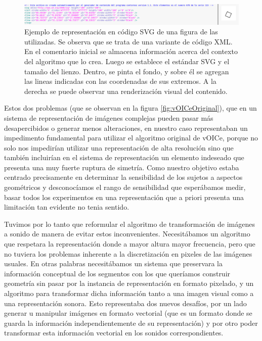\documentclass{article}
\begin{document}
    \begin{figure}
        \center
        \includegraphics[width=\textwidth]{Imagenes/678SVG.png}
        \caption{Ejemplo de representación en código SVG de una figura de las utilizadas. Se observa que se trata de una variante de código XML. En el comentario inicial se almacena información acerca del contexto del algoritmo que lo crea. Luego se establece el estándar SVG y el tamaño del lienzo. Dentro, se pinta el fondo, y sobre él se agregan las lineas indicadas con las coordenadas de sus extremos. A la derecha se puede observar una renderización visual del contenido.}
        \label{fig:SVGtoPNG}
    \end{figure}
    
    Estos dos problemas (que se observan en la figura \ref{fig:vOICeOriginal}), que en un sistema de representación de imágenes complejas pueden pasar más desapercibidos o generar menos alteraciones, en nuestro caso representaban un impedimento fundamental para utilizar el algoritmo original de vOICe, porque no solo nos impedirían utilizar una representación de alta resolución sino que también incluirían en el sistema de representación un elemento indeseado que presenta una muy fuerte ruptura de simetría. Como nuestro objetivo estaba centrado precisamente en determinar la sensibilidad de los sujetos a aspectos geométricos y desconocíamos el rango de sensibilidad que esperábamos medir, basar todos los experimentos en una representación que a priori presenta una limitación tan evidente no tenia sentido. 
    
    Tuvimos por lo tanto que reformular el algoritmo de transformación de imágenes a sonido de manera de evitar estos inconvenientes. Necesitábamos un algoritmo que respetara la representación donde a mayor altura mayor frecuencia, pero que no tuviera los problemas inherente a la discretización en pixeles de las imágenes usuales. En otras palabras necesitábamos un sistema que preservara la información conceptual de los segmentos con los que queríamos construir geometría sin pasar por la instancia de representación en formato pixelado, y un algoritmo para transformar dicha información tanto a una imagen visual como a una representación sonora. Esto representaba dos nuevos desafíos, por un lado generar u manipular imágenes en formato vectorial (que es un formato donde se guarda la información independientemente de su representación) y por otro poder transformar esta información vectorial en los sonidos correspondientes. 
    
\end{document}
